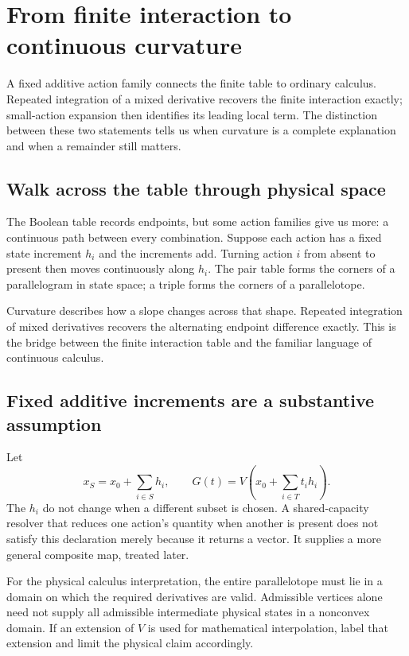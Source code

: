 \chapter{From finite interaction to continuous curvature}\label{ch:continuous-taylor}

A fixed additive action family connects the finite table to ordinary calculus. Repeated integration of a mixed derivative recovers the finite interaction exactly; small-action expansion then identifies its leading local term. The distinction between these two statements tells us when curvature is a complete explanation and when a remainder still matters.


\section{Walk across the table through physical space}
The Boolean table records endpoints, but some action families give us more: a continuous path between every combination. Suppose each action has a fixed state increment $h_i$ and the increments add. Turning action $i$ from absent to present then moves continuously along $h_i$. The pair table forms the corners of a parallelogram in state space; a triple forms the corners of a parallelotope.

Curvature describes how a slope changes across that shape. Repeated integration of mixed derivatives recovers the alternating endpoint difference exactly. This is the bridge between the finite interaction table and the familiar language of continuous calculus.

\section{Fixed additive increments are a substantive assumption}
Let
\begin{equation}\label{eq:additive-map}
 x_S=x_0+\sum_{i\in S}h_i,
 \qquad G(t)=V\left(x_0+\sum_{i\in T}t_i h_i\right).
\end{equation}
The $h_i$ do not change when a different subset is chosen. A shared-capacity resolver that reduces one action's quantity when another is present does not satisfy this declaration merely because it returns a vector. It supplies a more general composite map, treated later.

For the physical calculus interpretation, the entire parallelotope must lie in a domain on which the required derivatives are valid. Admissible vertices alone need not supply all admissible intermediate physical states in a nonconvex domain. If an extension of $V$ is used for mathematical interpolation, label that extension and limit the physical claim accordingly.

